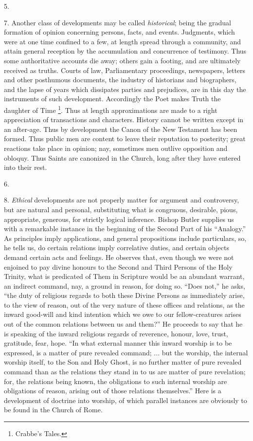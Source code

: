 5.

7. Another class of developments may be called \emph{historical};
being the gradual formation of opinion concerning
persons, facts, and events. Judgments, which were at one
time confined to a few, at length spread through a
community, and attain general reception by the
accumulation and concurrence of testimony. Thus some
authoritative accounts die away; others gain a footing,
and are ultimately received as truths. Courts of law,
Parliamentary proceedings, newspapers, letters and other
posthumous documents, the industry of historians and
biographers, and the lapse of years which dissipates
parties and prejudices, are in this day the instruments
of such development. Accordingly the Poet makes Truth the
daughter of Time \footnote{Crabbe's Tales.}. Thus at length approximations are made to a
right appreciation of transactions and characters.
History cannot be written except in an after-age. Thus by
development the Canon of the New Testament has been
formed. Thus public men are content to leave their
reputation to posterity; great reactions take place in
opinion; nay, sometimes men outlive opposition and
obloquy. Thus Saints are canonized in the Church, long
after they have entered into their rest.

6.

8. \emph{Ethical} developments are not properly matter
for argument and controversy, but are natural and
personal, substituting what is congruous, desirable,
pious, appropriate, generous, for strictly logical
inference. Bishop Butler supplies us with a remarkable
instance in the beginning of the Second Part of his
``Analogy.'' As principles imply applications,
and general propositions include particulars, so, he
tells us, do certain relations imply correlative duties,
and certain objects demand certain acts and feelings. He
observes that, even though we were not enjoined to pay
divine honours to the Second and Third Persons of the
Holy Trinity, what is predicated of Them in Scripture
would be an abundant warrant, an indirect command, nay, a
ground in reason, for doing so. ``Does not,'' he
asks, ``the duty of religious regards to both these
Divine Persons as immediately arise, to the view of
reason, out of the very nature of these offices and
relations, as the inward good-will and kind intention
which we owe to our fellow-creatures arises out of the
common relations between us and them?'' He proceeds
to say that he is speaking of the inward religious
regards of reverence, honour, love, trust, gratitude,
fear, hope. ``In what external manner this inward
worship is to be expressed, is a matter of pure revealed
command; ... but the worship, the internal worship
itself, to the Son and Holy Ghost, is no further matter
of pure revealed command than as the relations they stand
in to us are matter of pure revelation; for, the
relations being known, the obligations to such internal
worship are obligations of reason, arising out of those
relations themselves.'' Here is a development of
doctrine into worship, of which parallel instances are
obviously to be found in the Church of Rome.

